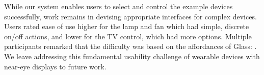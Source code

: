 While our system enables users to select and control the example devices successfully, work remains in devising appropriate interfaces for complex devices. Users rated ease of use higher for the lamp and fan which had simple, discrete on/off actions, and lower for the TV control, which had more options. Multiple participants remarked that the difficulty was based on the affordances of Glass: . 
We leave addressing this fundamental usability challenge of wearable devices with near-eye displays to future work.



